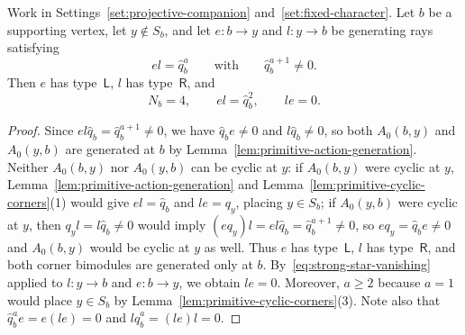 \begin{lemma}
\label{lem:nondeep-two-object-return}
Work in Settings~\ref{set:projective-companion} and~\ref{set:fixed-character}. Let $b$ be a supporting vertex, let $y\notin S_b$, and let $e\colon b\to y$ and $l\colon y\to b$ be generating rays satisfying
\begin{equation}
  el=\widehat q_b^a\qquad\text{with}\qquad\widehat q_b^{a+1}\ne0.
  \label{eq:external-return-assumption}
\end{equation}
Then $e$ has type~$\mathsf L$, $l$ has type~$\mathsf R$, and
\begin{equation}
  N_b=4,\qquad el=\widehat q_b^2,\qquad le=0.
  \label{eq:nondeep-two-object-table}
\end{equation}
\end{lemma}
\begin{proof}
Since $el\widehat q_b=\widehat q_b^{a+1}\ne0$, we have $\widehat q_be\ne0$ and $l\widehat q_b\ne0$, so both $A_0(b,y)$ and $A_0(y,b)$ are generated at $b$ by Lemma~\ref{lem:primitive-action-generation}. Neither $A_0(b,y)$ nor $A_0(y,b)$ can be cyclic at $y$: if $A_0(b,y)$ were cyclic at $y$, Lemma~\ref{lem:primitive-action-generation} and Lemma~\ref{lem:primitive-cyclic-corners}(1) would give $el=\widehat q_b$ and $le=q_y$, placing $y\in S_b$; if $A_0(y,b)$ were cyclic at $y$, then $q_yl=l\widehat q_b\ne0$ would imply $(eq_y)l=el\widehat q_b=\widehat q_b^{a+1}\ne0$, so $eq_y=\widehat q_be\ne0$ and $A_0(b,y)$ would be cyclic at $y$ as well. Thus $e$ has type~$\mathsf L$, $l$ has type~$\mathsf R$, and both corner bimodules are generated only at $b$. By~\eqref{eq:strong-star-vanishing} applied to $l\colon y\to b$ and $e\colon b\to y$, we obtain $le=0$. Moreover, $a\geq2$ because $a=1$ would place $y\in S_b$ by Lemma~\ref{lem:primitive-cyclic-corners}(3). Note also that $\widehat q_b^ae=e(le)=0$ and $l\widehat q_b^a=(le)l=0$.


\end{proof}
